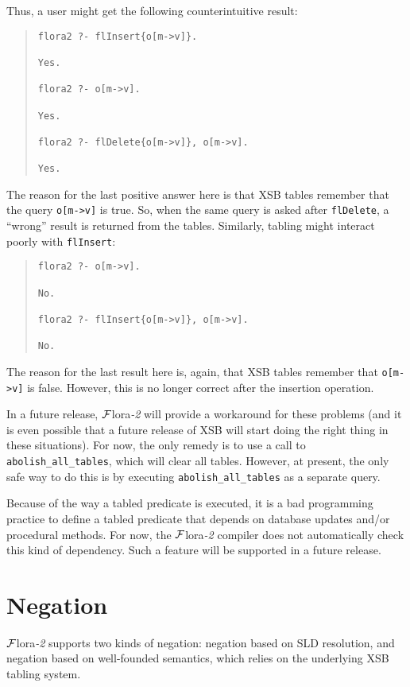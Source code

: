 \documentclass[11pt]{article}
\newcommand{\FLORA}{{\mbox{${\cal F}${\sc lora}\rm\emph{-2}}}\xspace}
\begin{document}
Thus, a user might get the following counterintuitive result:
\begin{quote}
\begin{verbatim}
flora2 ?- flInsert{o[m->v]}.

Yes.

flora2 ?- o[m->v].

Yes.

flora2 ?- flDelete{o[m->v]}, o[m->v].

Yes.
\end{verbatim}
\end{quote}
The reason for the last positive answer here is that XSB tables remember
that the query {\tt o[m->v]} is true. So, when the same query is asked
after {\tt flDelete}, a ``wrong'' result is returned from the tables. Similarly,
tabling might interact poorly with {\tt flInsert}:
\begin{quote}
\begin{verbatim}
flora2 ?- o[m->v].

No.

flora2 ?- flInsert{o[m->v]}, o[m->v].

No.
\end{verbatim}
\end{quote}
The reason for the last result here is, again, that XSB tables
remember that {\tt o[m->v]} is false. However, this is no longer
correct after the insertion operation.

In a future release, \FLORA will provide a workaround for these
problems (and it is even possible that a future release of XSB will
start doing the right thing in these situations). For now, the only
remedy is to use a call to {\tt abolish\_all\_tables}, which will
clear all tables.  However, at present, the only safe way to do this
is by executing {\tt abolish\_all\_tables} as a separate query.

Because of the way a tabled predicate is executed, it is a bad
programming practice to define a tabled predicate that depends on
database updates and/or procedural methods. For now, the \FLORA
compiler does not automatically check this kind of dependency. Such
a feature will be supported in a future release.


\section{Negation} \label{sec:negation}


\FLORA supports two kinds of negation: negation based on SLD resolution,
and negation based on well-founded semantics, which relies on the
underlying XSB tabling system.
\end{document}
